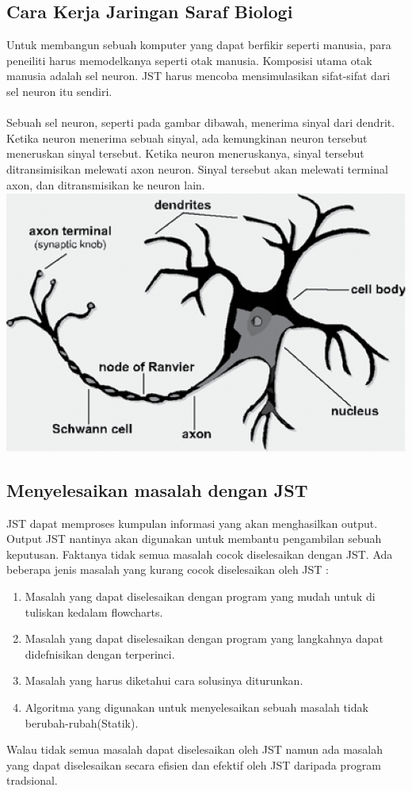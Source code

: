 \subsection{Cara Kerja Jaringan Saraf Biologi}
Untuk membangun sebuah komputer yang dapat berfikir seperti manusia, para
peneiliti harus memodelkanya seperti otak manusia. Komposisi utama otak
manusia adalah sel neuron. JST harus mencoba mensimulasikan sifat-sifat dari
sel neuron itu sendiri.\\\\
Sebuah sel neuron, seperti pada gambar dibawah, menerima sinyal dari dendrit. Ketika neuron menerima sebuah sinyal, ada kemungkinan neuron tersebut meneruskan sinyal tersebut. Ketika neuron meneruskanya, sinyal tersebut ditransimisikan melewati axon neuron. Sinyal tersebut akan melewati terminal axon, dan ditransmisikan ke neuron lain.\\
\includegraphics[width=\linewidth]{Gambar/mine/neuron}\\
\subsection{Menyelesaikan masalah dengan JST}
JST dapat memproses kumpulan informasi yang akan menghasilkan output. Output JST nantinya akan digunakan untuk membantu pengambilan sebuah keputusan. Faktanya tidak semua masalah cocok diselesaikan dengan JST. Ada beberapa jenis masalah yang kurang cocok diselesaikan oleh JST :\\
\begin{enumerate}
	\item Masalah yang dapat diselesaikan dengan program yang mudah untuk di tuliskan kedalam flowcharts.
	\item Masalah yang dapat diselesaikan dengan program yang langkahnya dapat didefnisikan dengan terperinci.
	\item Masalah yang harus diketahui cara solusinya diturunkan.
	\item Algoritma yang digunakan untuk menyelesaikan sebuah masalah tidak berubah-rubah(Statik).
\end{enumerate}
Walau tidak semua masalah dapat diselesaikan oleh JST namun ada masalah yang dapat diselesaikan secara efisien dan efektif oleh JST daripada program tradsional.\\\\
